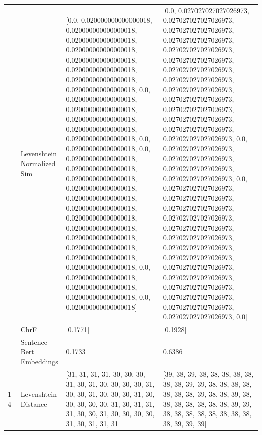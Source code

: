 \begin{tabular}{llll}
 & Levenshtein Normalized Sim & [0.0, 0.020000000000000018, 0.020000000000000018, 0.020000000000000018, 0.020000000000000018, 0.020000000000000018, 0.020000000000000018, 0.020000000000000018, 0.020000000000000018, 0.0, 0.020000000000000018, 0.020000000000000018, 0.020000000000000018, 0.020000000000000018, 0.020000000000000018, 0.0, 0.020000000000000018, 0.0, 0.020000000000000018, 0.020000000000000018, 0.020000000000000018, 0.020000000000000018, 0.020000000000000018, 0.020000000000000018, 0.020000000000000018, 0.020000000000000018, 0.020000000000000018, 0.020000000000000018, 0.020000000000000018, 0.020000000000000018, 0.0, 0.020000000000000018, 0.020000000000000018, 0.020000000000000018, 0.0, 0.020000000000000018] & [0.0, 0.027027027027026973, 0.027027027027026973, 0.027027027027026973, 0.027027027027026973, 0.027027027027026973, 0.027027027027026973, 0.027027027027026973, 0.027027027027026973, 0.027027027027026973, 0.027027027027026973, 0.027027027027026973, 0.027027027027026973, 0.027027027027026973, 0.027027027027026973, 0.0, 0.027027027027026973, 0.027027027027026973, 0.027027027027026973, 0.027027027027026973, 0.0, 0.027027027027026973, 0.027027027027026973, 0.027027027027026973, 0.027027027027026973, 0.027027027027026973, 0.027027027027026973, 0.027027027027026973, 0.027027027027026973, 0.027027027027026973, 0.027027027027026973, 0.027027027027026973, 0.027027027027026973, 0.027027027027026973, 0.027027027027026973, 0.0] \\
 & ChrF & [0.1771] & [0.1928] \\
 & Sentence Bert Embeddings & 0.1733 & 0.6386 \\
\cline{1-4}
\multirow[t]{4}{*}{Ihii na igwa ikuragira uthu-ini} & Levenshtein Distance & [31, 31, 31, 31, 30, 30, 30, 31, 30, 31, 30, 30, 30, 30, 31, 30, 30, 31, 30, 30, 30, 31, 30, 30, 30, 30, 30, 31, 30, 31, 31, 31, 30, 30, 31, 30, 30, 30, 30, 31, 30, 31, 31, 31] & [39, 38, 39, 38, 38, 38, 38, 38, 38, 38, 39, 39, 38, 38, 38, 38, 38, 38, 38, 39, 38, 38, 39, 38, 38, 38, 38, 38, 38, 38, 39, 39, 38, 38, 38, 38, 38, 38, 38, 38, 38, 39, 39, 39] \\

\end{tabular}
